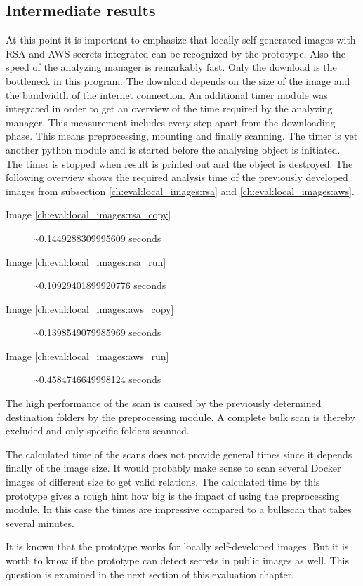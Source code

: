 \subsection{Intermediate results}
At this point it is important to emphasize that locally self-generated images with RSA and AWS secrets integrated can be recognized by the prototype.
Also the speed of the analyzing manager is remarkably fast. 
Only the download is the bottleneck in this program. The download depends on the size of the image and the bandwidth of the internet connection.
An additional timer module was integrated in order to get an overview of the time required by the analyzing manager.
This measurement includes every step apart from the downloading phase. This means preprocessing, mounting and finally scanning.
The timer is yet another python module and is started before the analysing object is initiated. 
The timer is stopped when result is printed out and the object is destroyed.
The following overview shows the required analysis time of the previously developed images from subsection \ref{ch:eval:local_images:rsa} and \ref{ch:eval:local_images:aws}. 
\begin{description}
\item [Image \ref{ch:eval:local_images:rsa_copy}] \textasciitilde 0.1449288309995609 seconds
\item [Image \ref{ch:eval:local_images:rsa_run}] \textasciitilde 0.10929401899920776 seconds
\item [Image \ref{ch:eval:local_images:aws_copy}] \textasciitilde 0.1398549079985969 seconds
\item [Image \ref{ch:eval:local_images:aws_run}] \textasciitilde 0.4584746649998124 seconds
\end{description}
The high performance of the scan is caused by the previously determined destination folders by the preprocessing module.
A complete bulk scan is thereby excluded and only specific folders scanned.

The calculated time of the scans does not provide general times since it depends finally of the image size. 
It would probably make sense to scan several Docker images of different size to get valid relations.
The calculated time by this prototype gives a rough hint how big is the impact of using the preprocessing module.
In this case the times are impressive compared to a bulkscan that takes several minutes.

It is known that the prototype works for locally self-developed images. But it is worth to know if the prototype can detect secrets in public images as well.
This question is examined in the next section of this evaluation chapter.